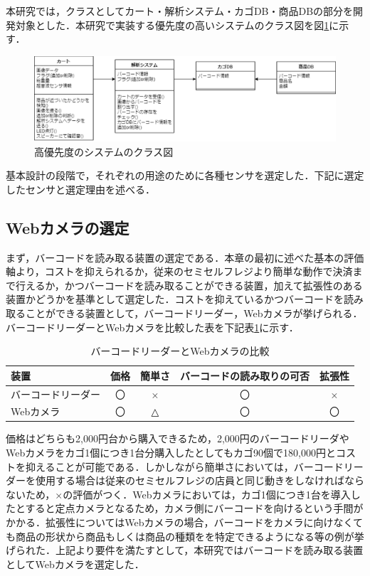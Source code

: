 本研究では，クラスとしてカート・解析システム・カゴDB・商品DBの部分を開発対象とした．本研究で実装する優先度の高いシステムのクラス図を図\ref{class_qr_2}に示す．


\begin{figure}[htbp]
\centering
\includegraphics[width=15cm]{./picture/class_qr_2.eps}
\caption{高優先度のシステムのクラス図}
\label{class_qr_2}
\end{figure}


基本設計の段階で，それぞれの用途のために各種センサを選定した．下記に選定したセンサと選定理由を述べる．


\subsection{Webカメラの選定}


まず，バーコードを読み取る装置の選定である．本章の最初に述べた基本の評価軸より，コストを抑えられるか，従来のセミセルフレジより簡単な動作で決済まで行えるか，かつバーコードを読み取ることができる装置，加えて拡張性のある装置かどうかを基準として選定した．コストを抑えているかつバーコードを読み取ることができる装置として，バーコードリーダー，Webカメラが挙げられる．バーコードリーダーとWebカメラを比較した表を下記表\ref{came}に示す．


\begin{table}[htb]
\begin{center}
\caption{バーコードリーダーとWebカメラの比較}
\begin{tabular}{|l|c|c|c|c|} \hline
装置 & 価格 & 簡単さ &バーコードの読み取りの可否 & 拡張性 \\ \hline \hline
バーコードリーダー & 〇 & × & 〇 & × \\
Webカメラ & 〇 & △ & 〇 &  〇 \\ \hline
\end{tabular}
\label{came}
\end{center}
\end{table}


価格はどちらも2,000円台から購入できるため，2,000円のバーコードリーダやWebカメラをカゴ1個につき1台分購入したとしてもカゴ90個で180,000円とコストを抑えることが可能である．しかしながら簡単さにおいては，バーコードリーダーを使用する場合は従来のセミセルフレジの店員と同じ動きをしなければならないため，×の評価がつく．Webカメラにおいては，カゴ1個につき1台を導入したとすると定点カメラとなるため，カメラ側にバーコードを向けるという手間がかかる．拡張性についてはWebカメラの場合，バーコードをカメラに向けなくても商品の形状から商品もしくは商品の種類をを特定できるようになる等の例が挙げられた．上記より要件を満たすとして，本研究ではバーコードを読み取る装置としてWebカメラを選定した．


